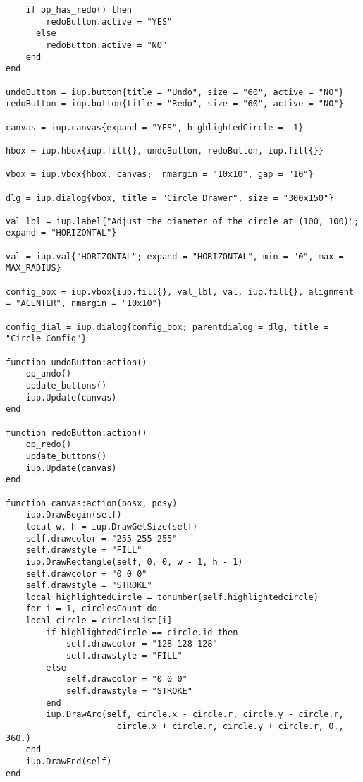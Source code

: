 \documentclass{ctexart}
\begin{document}
\begin{lstlisting}
	if op_has_redo() then
		redoButton.active = "YES"
	  else
		redoButton.active = "NO"
	end
end

undoButton = iup.button{title = "Undo", size = "60", active = "NO"}
redoButton = iup.button{title = "Redo", size = "60", active = "NO"}

canvas = iup.canvas{expand = "YES", highlightedCircle = -1}

hbox = iup.hbox{iup.fill{}, undoButton, redoButton, iup.fill{}}

vbox = iup.vbox{hbox, canvas;  nmargin = "10x10", gap = "10"}

dlg = iup.dialog{vbox, title = "Circle Drawer", size = "300x150"}

val_lbl = iup.label{"Adjust the diameter of the circle at (100, 100)"; expand = "HORIZONTAL"}

val = iup.val{"HORIZONTAL"; expand = "HORIZONTAL", min = "0", max = MAX_RADIUS}

config_box = iup.vbox{iup.fill{}, val_lbl, val, iup.fill{}, alignment = "ACENTER", nmargin = "10x10"}

config_dial = iup.dialog{config_box; parentdialog = dlg, title = "Circle Config"}

function undoButton:action()
	op_undo()
	update_buttons()
	iup.Update(canvas)
end

function redoButton:action()
	op_redo()
	update_buttons()
	iup.Update(canvas)
end

function canvas:action(posx, posy)
	iup.DrawBegin(self)
	local w, h = iup.DrawGetSize(self)
	self.drawcolor = "255 255 255"
	self.drawstyle = "FILL"
	iup.DrawRectangle(self, 0, 0, w - 1, h - 1)
	self.drawcolor = "0 0 0"
	self.drawstyle = "STROKE"
	local highlightedCircle = tonumber(self.highlightedcircle)
	for i = 1, circlesCount do
    local circle = circlesList[i]
		if highlightedCircle == circle.id then
			self.drawcolor = "128 128 128"
			self.drawstyle = "FILL"
		else
			self.drawcolor = "0 0 0"
			self.drawstyle = "STROKE"
		end
		iup.DrawArc(self, circle.x - circle.r, circle.y - circle.r, 
                      circle.x + circle.r, circle.y + circle.r, 0., 360.)
	end
	iup.DrawEnd(self)
end


\end{lstlisting}
\end{document}
